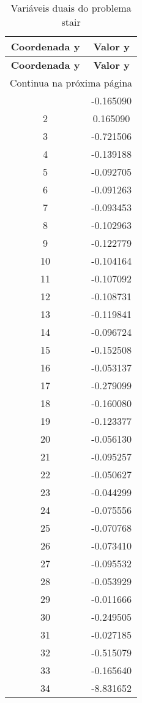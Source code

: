 \documentclass[12pt]{article}
\begin{document}
\begin{longtable}{@{}cc@{}}
\caption{Variáveis duais do problema stair} \\
\toprule
\textbf{Coordenada y} & \textbf{Valor y} \\
\midrule
\endfirsthead

\toprule
\textbf{Coordenada y} & \textbf{Valor y} \\
\midrule
\endhead

\midrule \multicolumn{2}{r}{{Continua na próxima página}} \\ \midrule
\endfoot

\bottomrule
\endlastfoot
1 & -0.165090 \\
2 & 0.165090 \\
3 & -0.721506 \\
4 & -0.139188 \\
5 & -0.092705 \\
6 & -0.091263 \\
7 & -0.093453 \\
8 & -0.102963 \\
9 & -0.122779 \\
10 & -0.104164 \\
11 & -0.107092 \\
12 & -0.108731 \\
13 & -0.119841 \\
14 & -0.096724 \\
15 & -0.152508 \\
16 & -0.053137 \\
17 & -0.279099 \\
18 & -0.160080 \\
19 & -0.123377 \\
20 & -0.056130 \\
21 & -0.095257 \\
22 & -0.050627 \\
23 & -0.044299 \\
24 & -0.075556 \\
25 & -0.070768 \\
26 & -0.073410 \\
27 & -0.095532 \\
28 & -0.053929 \\
29 & -0.011666 \\
30 & -0.249505 \\
31 & -0.027185 \\
32 & -0.515079 \\
33 & -0.165640 \\
34 & -8.831652 \\

\end{longtable}
\end{document}

